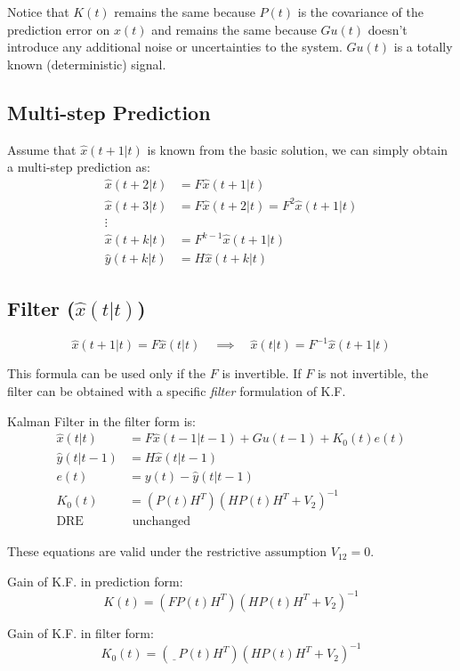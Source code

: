 Notice that $K(t)$ remains the same because $P(t)$ is the covariance of the prediction error on $x(t)$ and remains the same because $Gu(t)$ doesn't introduce any additional noise or uncertainties to the system.
$Gu(t)$ is a totally known (deterministic) signal.

\subsection{Multi-step Prediction}

Assume that $\hat{x}(t+1|t)$ is known from the basic solution, we can simply obtain a multi-step prediction as:
\begin{align*}
    \hat{x}(t+2|t) &= F \hat{x}(t+1|t) \\
    \hat{x}(t+3|t) &= F \hat{x}(t+2|t) = F^2\hat{x}(t+1|t) \\
    \vdots \\
    \hat{x}(t+k|t) &= F^{k-1} \hat{x}(t+1|t) \\
    \hat{y}(t+k|t) &= H\hat{x}(t+k|t)
\end{align*}

\subsection{Filter ($\hat{x}(t|t)$)}

\[
    \hat{x}(t+1|t) = F\hat{x}(t|t) \quad \implies \quad \hat{x}(t|t) = F^{-1}\hat{x}(t+1|t)
\]

This formula can be used only if the $F$ is invertible.
If $F$ is not invertible, the filter can be obtained with a specific \emph{filter} formulation of K.F.

Kalman Filter in the filter form is:
\begin{align*}
    \hat{x}(t|t) &= F\hat{x}(t-1|t-1) + Gu(t-1) + K_0(t)e(t) \\
    \hat{y}(t|t-1) &= H\hat{x}(t|t-1) \\
    e(t) &= y(t) - \hat{y}(t|t-1) \\
    K_0(t) &= \left(P(t)H^T\right) \left(HP(t)H^T+V_2\right)^{-1} \\
    \text{DRE}& \text{ unchanged}
\end{align*}

\begin{remark}
    These equations are valid under the restrictive assumption $V_{12} = 0$.
\end{remark}

\begin{remark}
    Gain of K.F. in prediction form:
    \[
        K(t) = \left( FP(t)H^T \right) \left( HP(t)H^T+V_2 \right)^{-1}
    \]

    Gain of K.F. in filter form:
    \[
        K_0(t) = \left( \underline{\phantom{F}} P(t)H^T \right) \left( HP(t)H^T+V_2 \right)^{-1}
    \]
\end{remark}


